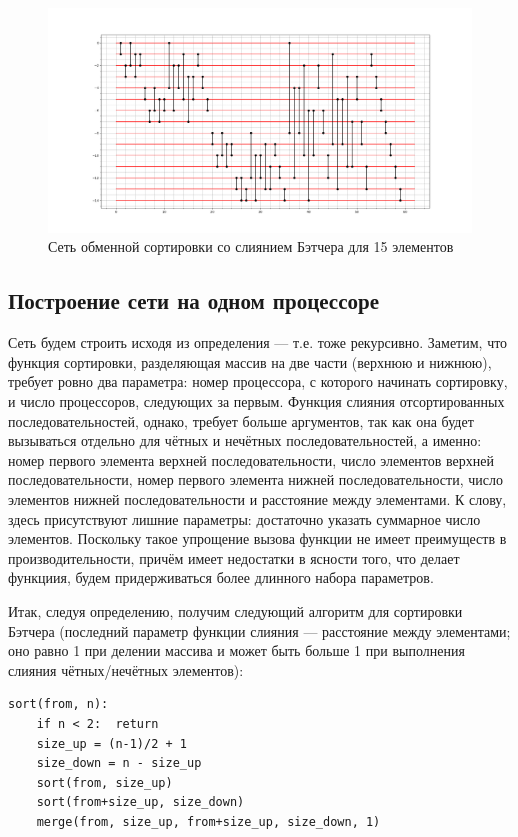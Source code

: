 \documentclass[14pt]{extarticle}
\begin{document}
\begin{figure}[H]
	\centering
	\includegraphics[scale=0.4]{network}
	\caption{Сеть обменной сортировки со слиянием Бэтчера для 15 элементов}
\end{figure}

\subsection{Построение сети на одном процессоре}
Сеть будем строить исходя из определения --- т.е. тоже рекурсивно. 
Заметим, что функция сортировки, разделяющая массив на две части (верхнюю и нижнюю), требует ровно два параметра: номер процессора, с которого начинать сортировку, и число процессоров, следующих за первым. Функция слияния отсортированных последовательностей, однако, требует больше аргументов, так как она будет вызываться отдельно для чётных и нечётных последовательностей, а именно: номер первого элемента верхней последовательности, число элементов верхней последовательности, номер первого элемента нижней последовательности, число элементов нижней последовательности и расстояние между элементами. К слову, здесь присутствуют лишние параметры: достаточно указать суммарное число элементов. Поскольку такое упрощение вызова функции не имеет преимуществ в производительности, причём имеет недостатки в ясности того, что делает функциия, будем придерживаться более длинного набора параметров.

Итак, следуя определению, получим следующий алгоритм для сортировки Бэтчера (последний параметр функции слияния --- расстояние между элементами; оно равно 1 при делении массива и может быть больше 1 при выполнения слияния чётных/нечётных элементов):
\begin{lstlisting}
sort(from, n):
	if n < 2:  return
	size_up = (n-1)/2 + 1
	size_down = n - size_up
	sort(from, size_up)
	sort(from+size_up, size_down)
	merge(from, size_up, from+size_up, size_down, 1)
\end{lstlisting}
\end{document}
